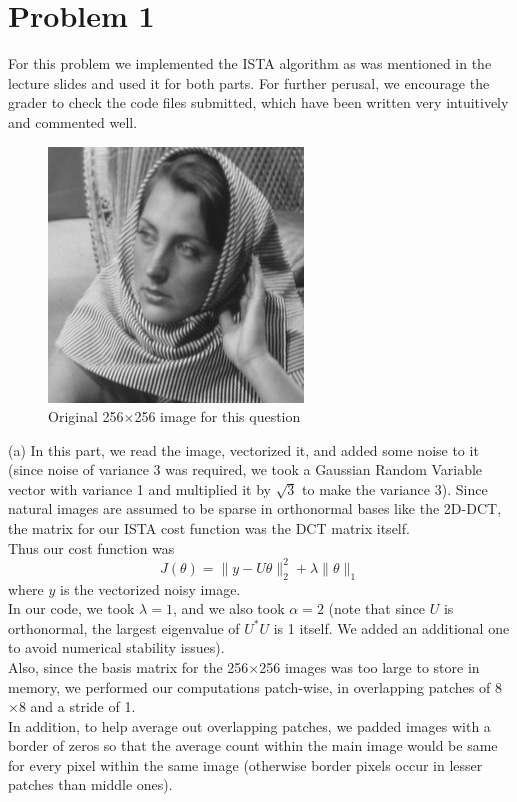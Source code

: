 \documentclass[a4paper,11pt]{article}
\numberwithin{definition}{section}
\numberwithin{mytheorem}{subsection}
\begin{document}
\section{Problem 1}
For this problem we implemented the ISTA algorithm as was mentioned in the lecture slides and used it for both parts. For further perusal, we encourage the grader to check the code files submitted, which have been written very intuitively and commented well.
\begin{figure}[H]
    \includegraphics{barbara256.png}
    \caption{Original 256$\times$256 image for this question}
\end{figure}
(a) In this part, we read the image, vectorized it, and added some noise to it (since noise of variance 3 was required, we took a Gaussian Random Variable vector with variance 1 and multiplied it by $\sqrt{3}$ to make the variance 3). Since natural images are assumed to be sparse in orthonormal bases like the 2D-DCT, the matrix for our ISTA cost function was the DCT matrix itself. \\
Thus our cost function was
$$J(\theta) = \lVert y - U\theta\rVert^2_2 + \lambda\lVert\theta\rVert_1$$
where $y$ is the vectorized noisy image.\\
In our code, we took $\lambda = 1$, and we also took $\alpha = 2$ (note that since $U$ is orthonormal, the largest eigenvalue of $U^*U$ is 1 itself. We added an additional one to avoid numerical stability issues).\\
Also, since the basis matrix for the 256$\times$256 images was too large to store in memory, we performed our computations patch-wise, in overlapping patches of 8$\times$8 and a stride of 1.\\
In addition, to help average out overlapping patches, we padded images with a border of zeros so that the average count within the main image would be same for every pixel within the same image (otherwise border pixels occur in lesser patches than middle ones).\\
\end{document}
